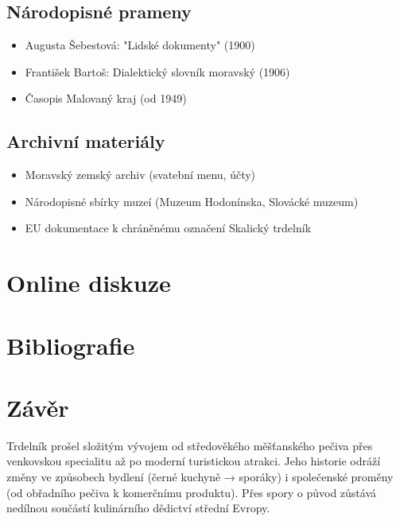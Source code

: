 \documentclass[a5paper,10pt]{book}
\begin{document}
\section{Národopisné prameny}
\begin{itemize}
\item Augusta Šebestová: "Lidské dokumenty" (1900)
\item František Bartoš: Dialektický slovník moravský (1906)
\item Časopis Malovaný kraj (od 1949)
\end{itemize}

\section{Archivní materiály}
\begin{itemize}
\item Moravský zemský archiv (svatební menu, účty)
\item Národopisné sbírky muzeí (Muzeum Hodonínska, Slovácké muzeum)
\item EU dokumentace k chráněnému označení Skalický trdelník
\end{itemize}

\chapter{Online diskuze}
\label{chap:diskuze}


\chapter{Bibliografie}
\label{chap:bibliografie}



\chapter{Závěr}

Trdelník prošel složitým vývojem od středověkého měšťanského pečiva přes venkovskou specialitu až po moderní turistickou atrakci. Jeho historie odráží změny ve způsobech bydlení (černé kuchyně → sporáky) i společenské proměny (od obřadního pečiva k komerčnímu produktu). Přes spory o původ zůstává nedílnou součástí kulinárního dědictví střední Evropy.

  
\end{document}
